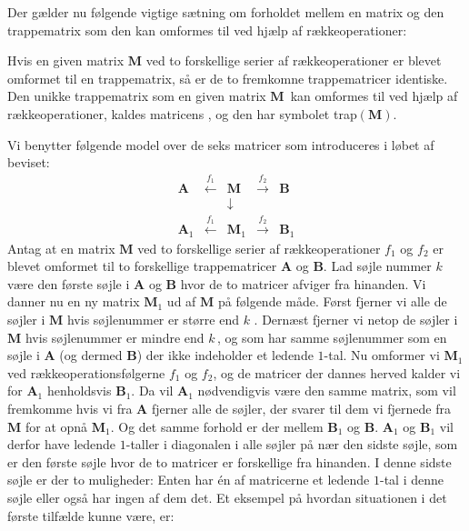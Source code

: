 Der gælder nu følgende vigtige sætning om forholdet mellem en matrix og den trappematrix som den kan omformes til ved hjælp af rækkeoperationer:

\begin{theorem}[Trappeform]\label{TN2.13b}
Hvis en given matrix $\mathbf{M}$ ved to forskellige serier af rækkeoperationer er blevet omformet til en trappematrix, så er de to fremkomne trappematricer identiske.\bs
Den unikke trappematrix som en given matrix $\mathbf{M}\,$ kan omformes til ved hjælp af rækkeoperationer, kaldes matricens , og den har symbolet trap$(\mathbf{M})$.
\end{theorem}

\begin{bevis}
Vi benytter følgende model over de seks matricer som introduceres i løbet af beviset:
\begin{equation}
\begin{array}{llcrr}
\mathbf{A}&\stackrel{f_1}{\longleftarrow}&\mathbf{M}&\stackrel{f_2}{\longrightarrow}&\mathbf{B}\\
&&\downarrow&&\\
\mathbf{A}_1&\stackrel{f_1}{\longleftarrow}&\mathbf{M}_1&\stackrel{f_2}{\longrightarrow}&\mathbf{B}_1
\end{array}
\end{equation}
Antag at en matrix $\mathbf{M}$ ved to forskellige serier af rækkeoperationer $f_1$ og $f_2$ er blevet omformet til to forskellige trappematricer $\mathbf{A}$ og $\mathbf{B}$. Lad søjle nummer $k$ være den første søjle i $\mathbf{A}$ og $\mathbf{B}$ hvor de to matricer afviger fra hinanden. Vi danner nu en ny matrix $\mathbf{M}_1$ ud af $\mathbf{M}$ på følgende måde. Først fjerner vi alle de søjler i $\mathbf{M}$ hvis søjlenummer er større end $k$ . Dernæst fjerner vi netop de søjler i $\mathbf{M}$ hvis søjlenummer er mindre end $k\,$, og som har samme søjlenummer som en søjle i $\mathbf{A}$ (og dermed $\mathbf{B}$) der ikke indeholder et ledende $1$-tal.\bs
Nu omformer vi $\mathbf{M}_1$ ved rækkeoperationsfølgerne $f_1$ og $f_2$, og de matricer der dannes herved kalder vi for $\mathbf{A}_1$ henholdsvis $\mathbf{B}_1$. Da vil $\mathbf{A}_1$ nødvendigvis være den samme matrix, som vil fremkomme hvis vi fra $\mathbf{A}$ fjerner alle de søjler, der svarer til dem vi fjernede fra $\mathbf{M}$ for at opnå $\mathbf{M}_1$. Og det samme forhold er der mellem $\mathbf{B}_1$ og $\mathbf{B}$. $\mathbf{A}_1$ og $\mathbf{B}_1$ vil derfor have ledende $1$-taller i diagonalen i alle søjler på nær den sidste søjle, som er den første søjle hvor de to matricer er forskellige fra hinanden. I denne sidste søjle er der to muligheder: Enten har én af matricerne et ledende $1$-tal i denne søjle eller også har ingen af dem det. Et eksempel på hvordan situationen i det første tilfælde kunne være, er:

\end{bevis}
